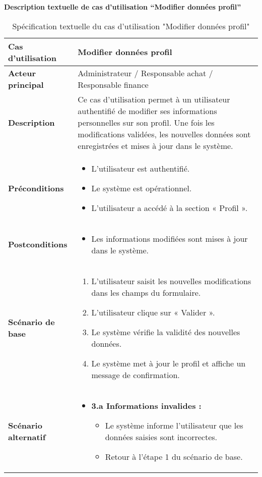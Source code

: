\documentclass[a4paper,11pt]{report}
\begin{document}
\textbf{Description textuelle de cas d’utilisation “Modifier données profil”}

\begin{table}[H]
  \centering
  \renewcommand{\arraystretch}{1.5}
  \caption{Spécification textuelle du cas d'utilisation "Modifier données profil"}
  \begin{tabularx}{\textwidth}{|l|X|}
    \hline
    \textbf{Cas d'utilisation} & Modifier données profil \\ \hline
    \textbf{Acteur principal}   & Administrateur / Responsable achat / Responsable finance \\ \hline
    \textbf{Description}        & Ce cas d'utilisation permet à un utilisateur authentifié de modifier ses informations personnelles sur son profil. Une fois les modifications validées, les nouvelles données sont enregistrées et mises à jour dans le système. \\ \hline
    \textbf{Préconditions}      &
    \begin{itemize}[leftmargin=*]
      \item L’utilisateur est authentifié.
      \item Le système est opérationnel.
      \item L’utilisateur a accédé à la section « Profil ».
    \end{itemize} \\ \hline
    \textbf{Postconditions}     &
    \begin{itemize}[leftmargin=*]
      \item Les informations modifiées sont mises à jour dans le système.
    \end{itemize} \\ \hline
    \textbf{Scénario de base}   &
    \begin{enumerate}[leftmargin=*]
      \item L’utilisateur saisit les nouvelles modifications dans les champs du formulaire.
      \item L’utilisateur clique sur « Valider ».
      \item Le système vérifie la validité des nouvelles données.
      \item Le système met à jour le profil et affiche un message de confirmation.
    \end{enumerate} \\ \hline
    \textbf{Scénario alternatif} &
    \begin{itemize}[leftmargin=*]
      \item \textbf{3.a Informations invalides :}
        \begin{itemize}[leftmargin=1em]
          \item Le système informe l’utilisateur que les données saisies sont incorrectes.
          \item Retour à l’étape 1 du scénario de base.
        \end{itemize}
    \end{itemize} \\ \hline
  \end{tabularx}
\end{table}
\end{document}
